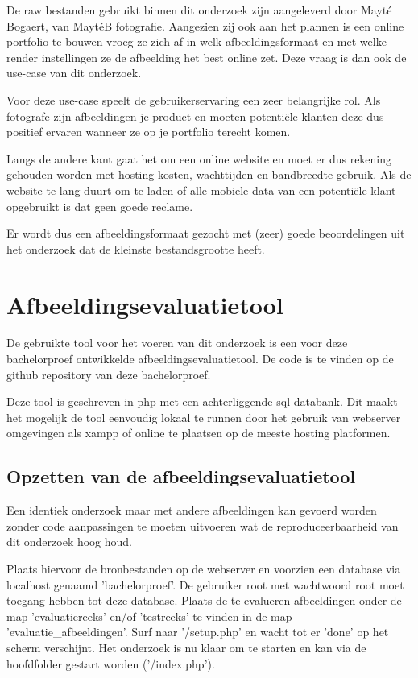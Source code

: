 De \gls{raw} bestanden gebruikt binnen dit onderzoek zijn aangeleverd door Mayté Bogaert, van MaytéB fotografie. Aangezien zij ook aan het plannen is een online portfolio te bouwen vroeg ze zich af in welk \gls{afbeeldingsformaat} en met welke \gls{render} instellingen ze de afbeelding het best online zet. Deze vraag is dan ook de \gls{use-case} van dit onderzoek.

Voor deze \gls{use-case} speelt de gebruikerservaring een zeer belangrijke rol. Als fotografe zijn afbeeldingen je product en moeten potentiële klanten deze dus positief ervaren wanneer ze op je portfolio terecht komen.

Langs de andere kant gaat het om een online website en moet er dus rekening gehouden worden met \gls{hosting} kosten, wachttijden en \gls{bandbreedte} gebruik. Als de website te lang duurt om te laden of alle mobiele data van een potentiële klant opgebruikt is dat geen goede reclame.

Er wordt dus een \gls{afbeeldingsformaat} gezocht met (zeer) goede beoordelingen uit het onderzoek dat de kleinste bestandsgrootte heeft.

\section{Afbeeldingsevaluatietool}
\label{sec:onderzoek-evaluatietool}

De gebruikte tool voor het voeren van dit onderzoek is een voor deze bachelorproef ontwikkelde \gls{afbeeldingsevaluatietool}. De code is te vinden op de \gls{github} repository van deze bachelorproef. 

Deze tool is geschreven in \gls{php} met een achterliggende \gls{sql} databank. Dit maakt het mogelijk de tool eenvoudig lokaal te runnen door het gebruik van webserver omgevingen als \gls{xampp} of online te plaatsen op de meeste \gls{hosting} platformen.

\subsection{Opzetten van de afbeeldingsevaluatietool}
\label{sec:onderzoek-evaluatietool-setup}

Een identiek onderzoek maar met andere afbeeldingen kan gevoerd worden zonder code aanpassingen te moeten uitvoeren wat de reproduceerbaarheid van dit onderzoek hoog houd. 

Plaats hiervoor de bronbestanden op de webserver en voorzien een database via localhost genaamd 'bachelorproef'. De gebruiker root met wachtwoord root moet toegang hebben tot deze database. Plaats de te evalueren afbeeldingen onder de map 'evaluatiereeks' en/of 'testreeks' te vinden in de map 'evaluatie\_afbeeldingen'. Surf naar '/setup.php' en wacht tot er 'done' op het scherm verschijnt. Het onderzoek is nu klaar om te starten en kan via de hoofdfolder gestart worden ('/index.php').

